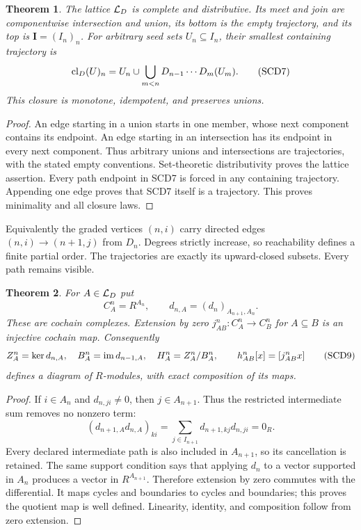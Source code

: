 \documentclass[11pt,a4paper]{article}
\newtheorem{theorem}{Theorem}[section]
\theoremstyle{definition}\newtheorem{definition}[theorem]{Definition}
\begin{document}
\begin{theorem}
The lattice \(\mathcal L_D\) is complete and distributive. Its meet and join
are componentwise intersection and union, its bottom is the empty
trajectory, and its top is \(\mathbf I=(I_n)_n\).
For arbitrary seed sets \(U_n\subseteq I_n\), their smallest containing
trajectory is
\[
 \operatorname{cl}_D(U)_n=U_n\cup
 \bigcup_{m<n}D_{n-1}\cdots D_m(U_m).
 \tag{SCD7}
\]
This closure is monotone, idempotent, and preserves unions.
\end{theorem}
\begin{proof}
An edge starting in a union starts in one member, whose next component
contains its endpoint. An edge starting in an intersection has its
endpoint in every next component. Thus arbitrary unions and intersections
are trajectories, with the stated empty conventions. Set-theoretic
distributivity proves the lattice assertion. Every path endpoint in SCD7
is forced in any containing trajectory. Appending one edge proves that
SCD7 itself is a trajectory. This proves minimality and all closure laws.
\end{proof}

Equivalently the graded vertices \((n,i)\) carry directed edges
\((n,i)\to(n+1,j)\) from \(D_n\). Degrees strictly increase, so
reachability defines a finite partial order. The trajectories are
exactly its upward-closed subsets. Every path remains visible.

\begin{theorem}
For \(A\in\mathcal L_D\) put
\[
 C_A^n=R^{A_n},\qquad d_{n,A}=(d_n)_{A_{n+1},A_n}.
 \tag{SCD8}
\]
These are cochain complexes. Extension by zero \(j_{AB}^n:C_A^n\to C_B^n\)
for \(A\subseteq B\) is an injective cochain map. Consequently
\[
 Z_A^n=\ker d_{n,A},\quad B_A^n=\operatorname{im} d_{n-1,A},\quad
 H_A^n=Z_A^n/B_A^n,\qquad
 h_{AB}^n[x]=[j_{AB}^nx]
 \tag{SCD9}
\]
defines a diagram of \(R\)-modules, with exact composition of its maps.
\end{theorem}
\begin{proof}
If \(i\in A_n\) and \(d_{n,ji}\ne0\), then \(j\in A_{n+1}\).
Thus the restricted intermediate sum removes no nonzero term:
\[
 (d_{n+1,A}d_{n,A})_{ki}
 =\sum_{j\in I_{n+1}}d_{n+1,kj}d_{n,ji}=0_R.
\]
Every declared intermediate path is also included in \(A_{n+1}\),
so its cancellation is retained. The same support condition says
that applying \(d_n\) to a vector supported in \(A_n\) produces
a vector in \(R^{A_{n+1}}\). Therefore extension by zero commutes
with the differential. It maps cycles and boundaries to cycles
and boundaries; this proves the quotient map is well defined.
Linearity, identity, and composition follow from zero extension.
\end{proof}
\end{document}
